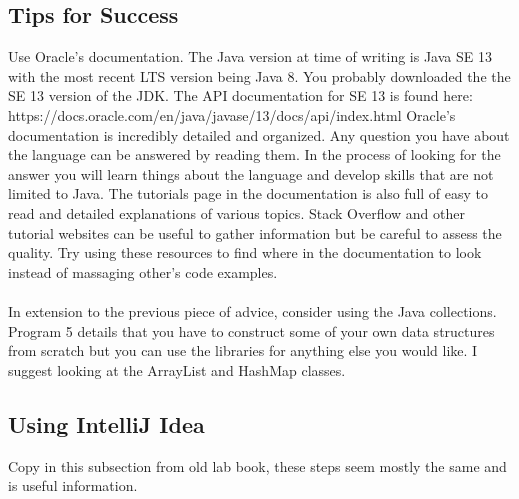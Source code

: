 \documentclass[../../main.tex]{subfiles}
\begin{document}
\subsection{Tips for Success}
Use Oracle's documentation. The Java version at time of writing is Java
SE 13 with the most recent LTS version being Java 8.
You probably downloaded the the SE 13 version of the JDK. The API
documentation for SE 13 is found here:
\vspace{2em}
https://docs.oracle.com/en/java/javase/13/docs/api/index.html
\vspace{2em}
Oracle's documentation is incredibly detailed and organized. Any question you have about the language can be answered by
reading them. In the process of looking for the answer you will learn things about the language and develop skills that are not
limited to Java. The tutorials page in the documentation is also full of easy to read and detailed explanations of various topics.
Stack Overflow and other tutorial websites can be useful to gather information but be careful to assess the quality. Try using
these resources to find where in the documentation to look instead of massaging other's code examples.
\\\\
In extension to the previous piece of advice, consider using the Java collections. Program 5 details that you have to construct
some of your own data structures from scratch but you can use the libraries for anything else you would like. I suggest looking
at the ArrayList and HashMap classes.

\subsection{Using IntelliJ Idea}
Copy in this subsection from old lab book, these steps seem mostly the same and is useful information.
\end{document}
